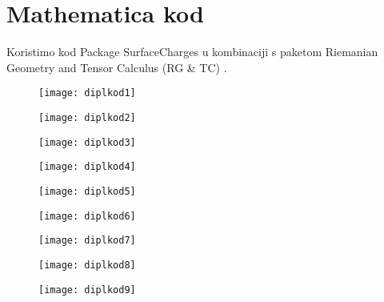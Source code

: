 \chapter{Mathematica kod}\label{cha:Mathematica}

Koristimo kod Package SurfaceCharges u kombinaciji s paketom Riemanian Geometry and Tensor Calculus (RG \& TC) \citep{ComperePaket, RGTC}.

\begin{figure}
\centering
 \hspace*{-1.8cm}\texttt{[image: diplkod1]}
\end{figure} 

\begin{figure}
\centering
 \hspace*{-1.8cm}\texttt{[image: diplkod2]}
\end{figure} 

\begin{figure}
\centering
 \hspace*{-1.8cm}\texttt{[image: diplkod3]}
\end{figure} 

\begin{figure}
\centering
 \hspace*{-1.8cm}\texttt{[image: diplkod4]}
\end{figure} 

\begin{figure}
\centering
 \hspace*{-1.8cm}\texttt{[image: diplkod5]}
\end{figure} 

\begin{figure}
\centering
 \hspace*{-1.8cm}\texttt{[image: diplkod6]}
\end{figure} 

\begin{figure}
\centering
 \hspace*{-1.8cm}\texttt{[image: diplkod7]}
\end{figure} 

\begin{figure}
\centering
 \hspace*{-1.8cm}\texttt{[image: diplkod8]}
\end{figure} 

\begin{figure}
\centering
 \hspace*{-1.8cm}\texttt{[image: diplkod9]}
\end{figure} 

